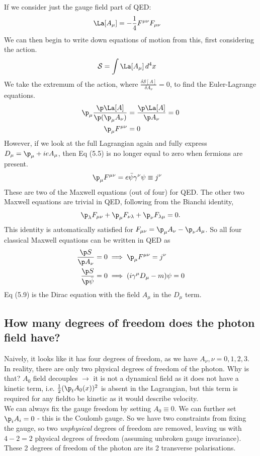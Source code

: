 \documentclass[relqm.tex]{subfiles}
\begin{document}
If we consider just the gauge field part of QED:
\begin{align}
    \La[A_\mu] &= -\frac14 F^{\mu\nu}F_{\mu\nu}
\end{align} 
We can then begin to write down equations of motion from this, first considering the action.
\begin{align}
    \mathcal{S} &= \int \La[A_\mu]\,d^4x
\end{align}
We take the extremum of the action, where $\frac{\delta\mathcal{S}[A]}{\delta A_\nu}=0$, to find the Euler-Lagrange equations. 
\begin{align}
    \p_\mu \frac{\p\La[A]}{\p(\p_\mu A_\nu)} &= \frac{\p\La[A]}{\p A_\nu} = 0 \\
    \p_\mu F^{\mu\nu} &= 0
\end{align}
However, if we look at the full Lagrangian again and fully express $D_\mu = \p_\mu + ieA_\mu$, then Eq (5.5) is no longer equal to zero when fermions are present.
\begin{align}
    \p_\mu F^{\mu\nu} &= e\bar{\psi}\gamma^\nu\psi \equiv j^\nu
\end{align}
These are two of the Maxwell equations (out of four) for QED.
The other two Maxwell equations are trivial in QED, following from the Bianchi identity, 
\begin{align}
    \p_\lambda F_{\mu\nu} + \p_\mu F_{\nu\lambda} + \p_\nu F_{\lambda\mu} = 0.
\end{align}
This identity is automatically satisfied for $F_{\mu\nu} = \p_\mu A_\nu - \p_\nu A_\mu$.
So all four classical Maxwell equations can be written in QED as 
\begin{align}
    \frac{\p S}{\p A_\nu} = 0 &\implies \p_\mu F^{\mu\nu} = j^\nu \\
    \frac{\p S}{\p \bar{\psi}} = 0 &\implies (i\gamma^\mu D_\mu - m)\psi = 0  
\end{align}
Eq (5.9) is the Dirac equation with the field $A_\mu$ in the $D_\mu$ term. 

\subsection{How many degrees of freedom does the photon field have?}
Naively, it looks like it has four degrees of freedom, as we have $A_\nu, \nu = 0,1,2,3$. 
In reality, there are only two physical degrees of freedom of the photon.
Why is that?
$A_0$ field decouples $\to$ it is not a dynamical field as it does not have a kinetic term, i.e. $\frac12(\p_t A_0(x))^2$ is absent in the Lagrangian, but this term is required for any fieldto be kinetic as it would describe velocity.\\
We can always fix the gauge freedom by setting $A_0\equiv0$.
We can further set $\p_iA_i=0$ - this is the Coulomb gauge.
So we have two constraints from fixing the gauge, so two \emph{unphysical} degrees of freedom are removed, leaving us with $4-2=2$ physical degrees of freedom (assuming unbroken gauge invariance).
These 2 degrees of freedom of the photon are its 2 transverse polarisations. 
\end{document}
